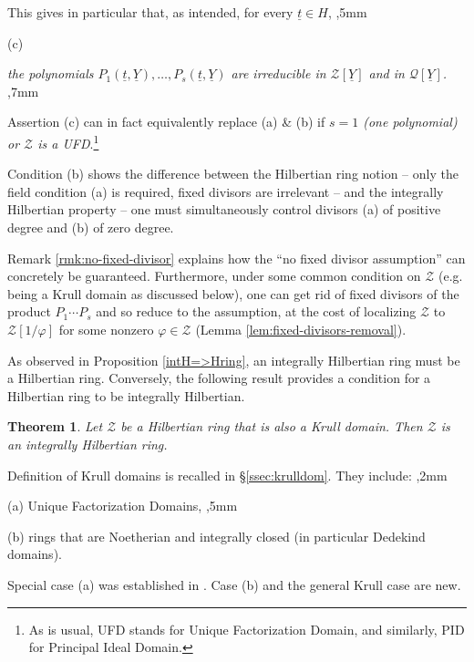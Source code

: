 \documentclass[11pt,a4paper,reqno]{amsart}
\newtheorem{thm}{Theorem}[section]
\theoremstyle{definition}
\begin{document}
This gives in particular that, as intended, for every $\underline{t} \in {H}$, 
,5mm

\noindent
(c) {\emph{the polynomials $P_1(\underline{t},\underline{Y}),\dots,P_s(\underline{t},\underline{Y})$ are irreducible in $\mathcal{Z}[\underline{Y}]$ and in $\mathcal{Q}[\underline{Y}]$.}
,7mm

\noindent
Assertion (c) can in fact equivalently replace (a)\hskip 2pt \&\hskip 2pt (b) if \emph{$s=1$ (one polynomial) or ${\mathcal Z}$ is a \emph{UFD}}.\footnote{As is usual, UFD stands for Unique Factorization Domain, and similarly, PID for Principal Ideal Domain.}
\vskip 1mm

Condition (b) shows the difference between the Hilbertian ring notion -- only the field condition (a) is required, fixed divisors are irrelevant -- and the integrally Hilbertian property -- one must simultaneously control divisors (a) of positive degree and (b) of zero degree.
\vskip 1mm

Remark \ref{rmk:no-fixed-divisor} explains how the ``no fixed divisor assumption'' can concretely be guaranteed. Furthermore, under some common condition on ${\mathcal Z}$ (\hbox{e.g.} being a Krull domain as discussed below), one can get rid of fixed divisors of the product $P_1\cdots P_s$ and so reduce to the assumption, at the cost of localizing ${\mathcal Z}$ to ${\mathcal Z}[1/\varphi]$ for some nonzero $\varphi \in {\mathcal Z}$ (Lemma \ref{lem:fixed-divisors-removal}).
\vskip 1mm


As observed in Proposition \ref{intH=>Hring}, an integrally Hilbertian ring must be a Hilbertian ring. Conversely, the following result provides a condition for a Hilbertian ring to be integrally Hilbertian.

\begin{thm} \label{thm:main1} Let ${\mathcal Z}$ be a Hilbertian ring that is also a Krull domain. Then ${\mathcal Z}$ is an integrally Hilbertian ring.
\end{thm}

Definition of Krull domains is recalled in \S \ref{ssec:krulldom}. They include:
,2mm

\noindent
(a) Unique Factorization Domains,
,5mm

\noindent
(b) rings that are Noetherian and integrally closed (in particular Dedekind domains).
\vskip 1mm

Special case (a) was established in  \cite{BDKN22}. 
Case (b) and the general Krull case are new. 
\vskip 1mm

}
\end{document}
